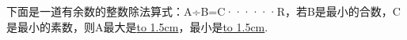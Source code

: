 下面是一道有余数的整数除法算式：A÷B=C······R，若B是最小的合数，C是最小的素数，则A最大是\underline{\hbox to 1.5cm{}}，最小是\underline{\hbox to 1.5cm{}}.